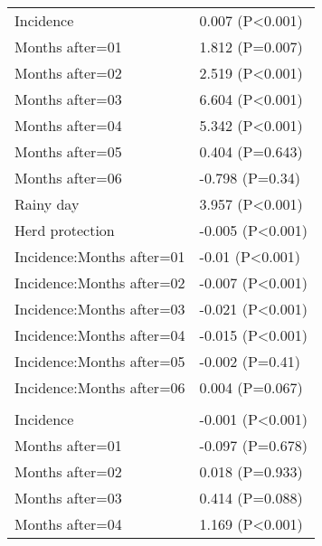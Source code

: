 \documentclass[]{article}
\begin{document}
\begin{longtable}[t]{ll}
\hspace{1em}Incidence & 0.007 (P<0.001)\\
\hspace{1em}Months after=01 & 1.812 (P=0.007)\\
\hspace{1em}Months after=02 & 2.519 (P<0.001)\\
\hspace{1em}Months after=03 & 6.604 (P<0.001)\\
\hspace{1em}Months after=04 & 5.342 (P<0.001)\\
\hspace{1em}Months after=05 & 0.404 (P=0.643)\\
\hspace{1em}Months after=06 & -0.798 (P=0.34)\\
\hspace{1em}Rainy day & 3.957 (P<0.001)\\
\hspace{1em}Herd protection & -0.005 (P<0.001)\\
\hspace{1em}Incidence:Months after=01 & -0.01 (P<0.001)\\
\hspace{1em}Incidence:Months after=02 & -0.007 (P<0.001)\\
\hspace{1em}Incidence:Months after=03 & -0.021 (P<0.001)\\
\hspace{1em}Incidence:Months after=04 & -0.015 (P<0.001)\\
\hspace{1em}Incidence:Months after=05 & -0.002 (P=0.41)\\
\hspace{1em}Incidence:Months after=06 & 0.004 (P=0.067)\\
\addlinespace[1.5em]
\multicolumn{2}{l}{\textbf{Temporary field worker}}\\
\hspace{1em}Incidence & -0.001 (P<0.001)\\
\hspace{1em}Months after=01 & -0.097 (P=0.678)\\
\hspace{1em}Months after=02 & 0.018 (P=0.933)\\
\hspace{1em}Months after=03 & 0.414 (P=0.088)\\
\hspace{1em}Months after=04 & 1.169 (P<0.001)\\

\end{longtable}
\end{document}
